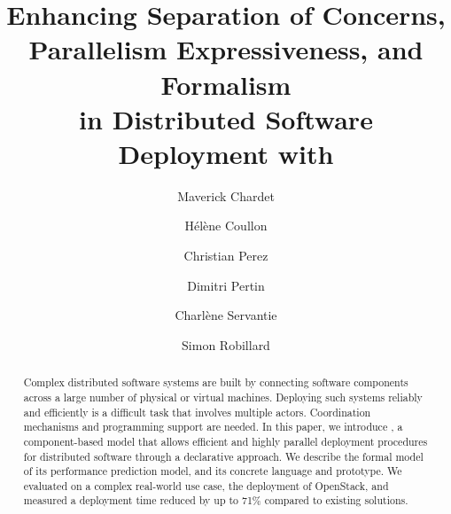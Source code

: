 \documentclass[5p]{elsarticle}
\begin{document}
\begin{frontmatter}

  \title{Enhancing Separation of Concerns, Parallelism Expressiveness, and
  Formalism\\ in Distributed Software Deployment with \mad}

  \author[label1]{Maverick Chardet}
  \author[label1]{Hélène Coullon}
  \author[label2]{Christian Perez}
  \author[label1]{Dimitri Pertin}
  \author[label1]{Charlène Servantie}
  \author[label1]{Simon Robillard}

\address[label1]{IMT Atlantique, Inria, LS2N, UBL, F-44307 Nantes, France}
\address[label2]{Univ Lyon, Inria, EnsL, UCBL, CNRS, LIP, Lyon, France}


\begin{abstract}
Complex distributed software systems are built by connecting software
components across a large number of physical or virtual machines.
Deploying such systems reliably and efficiently is a difficult task
that involves multiple actors. Coordination mechanisms and programming
support are needed.
%
In this paper, we introduce \mad, a component-based model that allows efficient and
highly parallel deployment procedures for distributed software
through a declarative approach. We describe the formal model of \mad
its performance prediction model, and its concrete language and
prototype. We evaluated \mad on a complex real-world use case, the
deployment of OpenStack, and measured a deployment time reduced by up
to 71\% compared to existing solutions.


\end{abstract}
\end{frontmatter}
\end{document}
